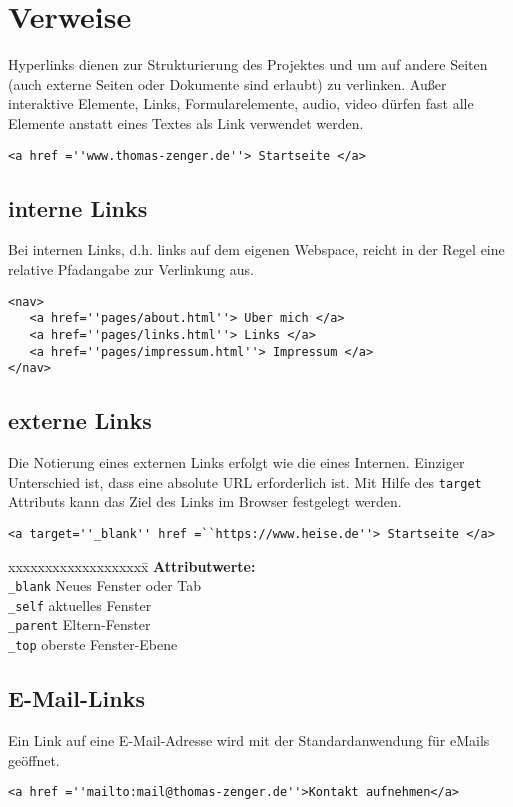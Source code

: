 \chapter{Verweise}
 Hyperlinks dienen zur Strukturierung des Projektes und um auf andere Seiten (auch externe Seiten oder Dokumente sind erlaubt) zu verlinken. Außer interaktive Elemente, Links, Formularelemente, audio, video dürfen fast alle Elemente anstatt eines Textes als Link verwendet werden.\\[-1.5em]
 \begin{verbatim}
<a href =''www.thomas-zenger.de''> Startseite </a>
\end{verbatim}
\section{interne Links}
Bei internen Links, d.h. links auf dem eigenen Webspace, reicht in der Regel eine relative Pfadangabe zur Verlinkung aus.
\begin{lstlisting}[caption=''Navigation'']
<nav>
   <a href=''pages/about.html''> Uber mich </a>
   <a href=''pages/links.html''> Links </a>
   <a href=''pages/impressum.html''> Impressum </a>
</nav>
\end{lstlisting}
\section{externe Links}
Die Notierung eines externen Links erfolgt wie die eines Internen. Einziger Unterschied ist, dass eine absolute URL erforderlich ist. Mit Hilfe des \texttt{target} Attributs kann das Ziel des Links im Browser festgelegt werden.\\[-1.5em]
 \begin{verbatim}
<a target=''_blank'' href =``https://www.heise.de''> Startseite </a>
\end{verbatim}
\begin{tabbing}
xxxxxxxxxxxxxxxxxxx\=\kill
\textbf{Attributwerte:}\\
\texttt{\_blank}		\>Neues Fenster oder Tab\\
\texttt{\_self}		\>aktuelles Fenster\\
\texttt{\_parent}		\>Eltern-Fenster\\
\texttt{\_top}		\>oberste Fenster-Ebene\\
\end{tabbing}
\section{E-Mail-Links}
Ein Link auf eine E-Mail-Adresse wird mit der Standardanwendung für eMails geöffnet.\\[-1.5em]
 \begin{verbatim}
<a href =''mailto:mail@thomas-zenger.de''>Kontakt aufnehmen</a>
\end{verbatim}
